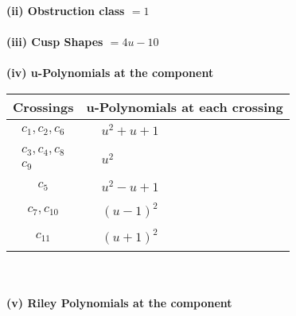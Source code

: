\documentclass[1p]{elsarticle_modified}
\theoremstyle{definition}
\begin{document}
\flushleft \textbf{(ii) Obstruction class $= 1$}\\~\\
\flushleft \textbf{(iii) Cusp Shapes $= 4 u-10$}\\~\\
\newpage\renewcommand{\arraystretch}{1}
\flushleft \textbf{(iv) u-Polynomials at the component}\newline \\
\begin{tabular}{m{50pt}|m{274pt}}
Crossings & \hspace{64pt}u-Polynomials at each crossing \\
\hline $$\begin{aligned}c_{1},c_{2},c_{6}\end{aligned}$$&$\begin{aligned}
&u^2+u+1
\end{aligned}$\\
\hline $$\begin{aligned}c_{3},c_{4},c_{8}\\c_{9}\end{aligned}$$&$\begin{aligned}
&u^2
\end{aligned}$\\
\hline $$\begin{aligned}c_{5}\end{aligned}$$&$\begin{aligned}
&u^2- u+1
\end{aligned}$\\
\hline $$\begin{aligned}c_{7},c_{10}\end{aligned}$$&$\begin{aligned}
&(u-1)^2
\end{aligned}$\\
\hline $$\begin{aligned}c_{11}\end{aligned}$$&$\begin{aligned}
&(u+1)^2
\end{aligned}$\\
\hline
\end{tabular}\\~\\
\newpage\renewcommand{\arraystretch}{1}
\flushleft \textbf{(v) Riley Polynomials at the component}\newline \\
\end{document}
